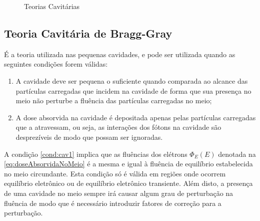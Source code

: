 \documentclass[11pt,a4paper]{article}
\begin{document}
		\begin{figure}[h]
			\centering
			\caption{Teorias Cavitárias}
			\label{fig:teoriasDasCavidades}
		\end{figure}

		
		\subsection*{Teoria Cavitária de Bragg-Gray}

			É a teoria utilizada nas pequenas cavidades, e pode ser utilizada quando as seguintes condições forem válidas:

			\begin{enumerate}[label=\textcolor{CarnationPink}{(\roman*)}]
				\item A cavidade deve ser pequena o suficiente quando comparada ao alcance das partículas carregadas que incidem na cavidade de forma que sua presença no meio não perturbe a fluência das partículas carregadas no meio;\label{cond:cav1}
				\item A dose absorvida na cavidade é depositada apenas pelas partículas carregadas que a atravessam, ou seja, as interações dos fótons na cavidade são desprezíveis de modo que possam ser ignoradas.\label{cond:cav2}
			\end{enumerate}


			A condição \ref{cond:cav1} implica que as fluências dos elétrons $\Phi_E(E)$ denotada na \ref{eq:doseAbsorvidaNoMeio} é a mesma e  igual à fluência de equilíbrio estabelecida no meio circundante. Esta condição só é válida em regiões onde ocorrem equilíbrio eletrônico ou de equilíbrio eletrônico transiente. Além disto, a presença de uma cavidade no meio sempre irá causar algum grau de perturbação na fluência de modo que é necessário introduzir fatores de correção para a perturbação.
\end{document}
